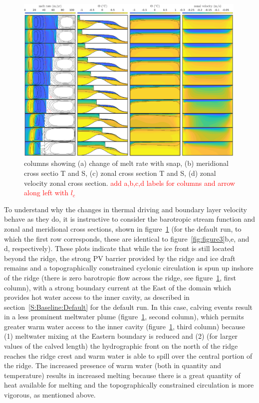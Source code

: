 \documentclass[draft]{agujournal2019}
\newcommand{\red}[1]{\textcolor{red}{#1}}
\begin{document}
\begin{figure}
    \centering
    \includegraphics[width = 0.99\textwidth]{../make_figures/plots/figure5.eps}
    \caption{columns showing (a) change of melt rate with snap, (b) meridional cross sectio T and S, (c) zonal cross section T and S, (d) zonal velocity zonal cross section. \red{add a,b,c,d labels for columns and arrow along left with $l_c$}}
    \label{fig:figure5}
\end{figure}

To understand why the changes in thermal driving and boundary layer velocity behave as they do, it is instructive to consider the barotropic stream function and zonal and meridional cross sections, shown in figure~\ref{fig:figure5} (for the default run, to which the first row corresponds, these are identical to figure~\ref{fig:figure3}b,e, and d, respectively). These plots indicate that while the ice front is still located beyond the ridge, the strong PV barrier provided by the ridge and ice draft remains and a topographically constrained cyclonic circulation is spun up inshore of the ridge (there is zero barotropic flow across the ridge, see figure~\ref{fig:figure5}, first column), with a strong boundary current at the East of the domain which provides hot water access to the inner cavity, as described in section~\ref{S:Baseline:Default} for the default run. In this case, calving events result in a less prominent meltwater plume (figure~\ref{fig:figure5}, second column), which permits greater warm water access to the inner cavity (figure~\ref{fig:figure5}, third column) because (1) meltwater mixing at the Eastern boundary is reduced and (2) (for larger values of the calved length) the hydrographic front on the north of the ridge reaches the ridge crest and warm water is able to spill over the central portion of the ridge. The increased presence of warm water (both in quantity and temperature) results in increased melting because there is a great quantity of heat available for melting and the topographically constrained circulation is more vigorous, as mentioned above.
\end{document}
